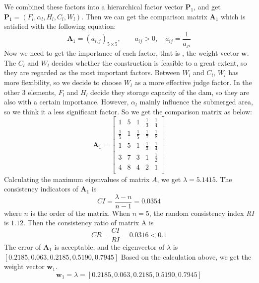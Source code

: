 \documentclass{mcmthesis}
\begin{document}
We combined these factors into a hierarchical factor vector $\textbf{P}_1$, and get $\textbf{P}_1 = (F_{l}, \alpha_{l}, H_{l}, C_{l}, W_{l})$. Then we can get the comparison matrix $\textbf{A}_1$ which is satisfied with the following equation:
\begin{equation}
\textbf{A}_1 = (a_{i,j})_{5\times5},\qquad a_{ij} > 0, \quad a_{ij} = \frac{1}{a_{ji}}
\end{equation}
Now we need to get the importance of each factor, that is , the weight vector $\textbf{w}$. The $C_{l}$ and $W_{l}$ decides whether the construction is feasible to a great extent, so they are regarded as the most important factors. Between $W_{l}$ and $C_{l}$, $W_{l}$ has more flexibility, so we decide to choose $W_{l}$ as a more effective judge factor. In the other 3 elements, $F_{l}$ and $H_{l}$ decide they storage capacity of the dam, so they are also with a certain importance. However, $\alpha_{l}$ mainly influence the submerged area, so we think it a less significant factor. So we get the comparison matrix as below:
\[\textbf{A}_1 = 
\left[
\begin{matrix}
1 & 5 & 1 & \frac{1}{3} & \frac{1}{4} \\
\frac{1}{5}  & 1 & \frac{1}{5} & \frac{1}{7} & \frac{1}{8} \\ 
1 & 5 & 1 & \frac{1}{3} & \frac{1}{4} \\
3 & 7 & 3 & 1 & \frac{1}{2} \\
4 & 8 & 4 & 2 & 1 \\
\end{matrix}
\right]
\]
Calculating the maximum eigenvalues of matrix $A$, we get $\lambda = 5.1415$. The consistency indicators of $\textbf{A}_1$ is \[\mathit{CI} = \frac{\lambda - n}{n - 1} = 0.0354\]
where $n$ is the order of the matrix. When $n = 5$, the random consistency index \textit{RI} is $1.12$. Then the consistency ratio of matrix A is \[\mathit{CR} = \frac{\mathit{CI}}{\mathit{RI}} = 0.0316 < 0.1 \]
The error of $\textbf{A}_1$ is acceptable, and the eigenvector of $\lambda$ is $\left[0.2185, 0.063, 0.2185, 0.5190, 0.7945\right]$
Based on the calculation above, we get the weight vector $\textbf{w}_{1}$.
\begin{equation}
\textbf{w}_{1} = \lambda = \left[0.2185, 0.063, 0.2185, 0.5190, 0.7945\right]
\end{equation}
\end{document}
